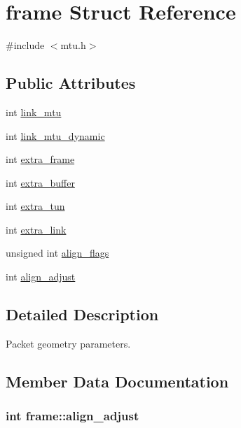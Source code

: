 \hypertarget{structframe}{}\section{frame Struct Reference}
\label{structframe}


{\ttfamily \#include $<$mtu.\+h$>$}

\subsection*{Public Attributes}
\begin{DoxyCompactItemize}
\item 
int \hyperlink{structframe_a1cb819c0d909fde0754358ab1a3efa27}{link\+\_\+mtu}
\item 
int \hyperlink{structframe_a6e689afc779ec821bc05750d3794e409}{link\+\_\+mtu\+\_\+dynamic}
\item 
int \hyperlink{structframe_ac86e1095a0ba3e1cc909aaba9ecf6360}{extra\+\_\+frame}
\item 
int \hyperlink{structframe_a751b9e1d0cf1c29cd4befef61d811f70}{extra\+\_\+buffer}
\item 
int \hyperlink{structframe_a692c06fcb8a7e839f14c44616809ce10}{extra\+\_\+tun}
\item 
int \hyperlink{structframe_aff384304bf6617e9326581562dd47db4}{extra\+\_\+link}
\item 
unsigned int \hyperlink{structframe_ae4656e48742f781f15b6887fc77ee035}{align\+\_\+flags}
\item 
int \hyperlink{structframe_a504f9b9d3aa50ee3424df82b7782d5fc}{align\+\_\+adjust}
\end{DoxyCompactItemize}


\subsection{Detailed Description}
Packet geometry parameters. 

\subsection{Member Data Documentation}
\hypertarget{structframe_a504f9b9d3aa50ee3424df82b7782d5fc}{}
\subsubsection[{align\+\_\+adjust}]{\setlength{\rightskip}{0pt plus 5cm}int frame\+::align\+\_\+adjust}\label{structframe_a504f9b9d3aa50ee3424df82b7782d5fc}
\hypertarget{structframe_ae4656e48742f781f15b6887fc77ee035}{}
